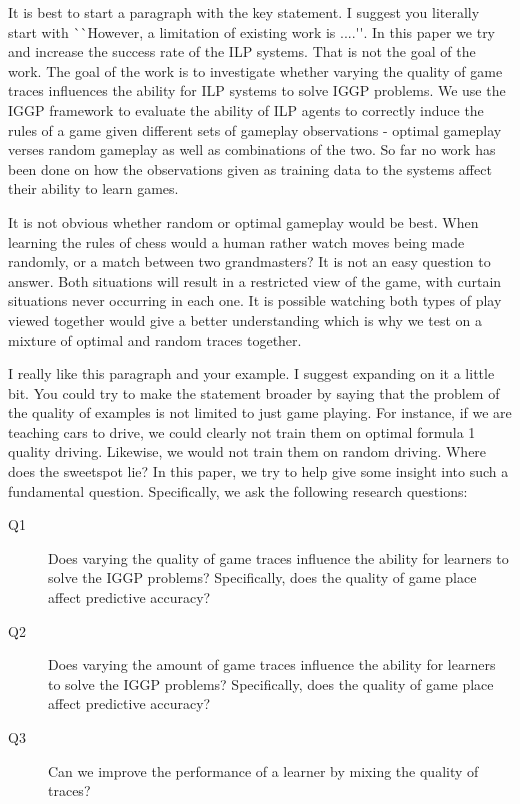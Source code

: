 
\ac{It is best to start a paragraph with the key statement. I suggest you literally start with ``However, a limitation of existing work is ....''}.
In this paper we try and increase the success rate of the ILP systems.
\ac{That is not the goal of the work. The goal of the work is to investigate whether varying the quality of game traces influences the ability for ILP systems to solve IGGP problems.}
We use the IGGP framework to evaluate the ability of ILP agents to correctly induce the rules of a game given different sets of gameplay observations - optimal gameplay verses random gameplay as well as combinations of the two. So far no work has been done on how the observations given as training data to the systems affect their ability to learn games.


It is not obvious whether random or optimal gameplay would be best. When learning the rules of chess would a human rather watch moves being made randomly, or a match between two grandmasters? It is not an easy question to answer. Both situations will result in a restricted view of the game, with curtain situations never occurring in each one. It is possible watching both types of play viewed together would give a better understanding which is why we test on a mixture of optimal and random traces together.


\ac{
I really like this paragraph and your example.
I suggest expanding on it a little bit.
You could try to make the statement broader by saying that the problem of the quality of examples is not limited to just game playing.
For instance, if we are teaching cars to drive, we could clearly not train them on optimal formula 1 quality driving.
Likewise, we would not train them on random driving.
Where does the sweetspot lie?
In this paper, we try to help give some insight into such a fundamental question.
Specifically, we ask the following research questions:
}


\begin{description}
\item[Q1] Does varying the quality of game traces influence the ability for learners to solve the IGGP problems? Specifically, does the quality of game place affect predictive accuracy?
\item[Q2] Does varying the amount of game traces influence the ability for learners to solve the IGGP problems? Specifically, does the quality of game place affect predictive accuracy?
\item[Q3] Can we improve the performance of a learner by mixing the quality of traces?
\end{description}

